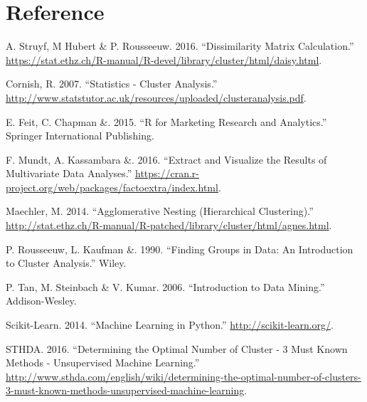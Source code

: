 \documentclass[]{article}
\begin{document}
\newpage

\section*{Reference}\label{reference}

\hypertarget{refs}{}
\hypertarget{ref-Str2016}{}
A. Struyf, M Hubert \& P. Rousseeuw. 2016. ``Dissimilarity Matrix
Calculation.''
\url{https://stat.ethz.ch/R-manual/R-devel/library/cluster/html/daisy.html}.

\hypertarget{ref-Cor2007}{}
Cornish, R. 2007. ``Statistics - Cluster Analysis.''
\url{http://www.statstutor.ac.uk/resources/uploaded/clusteranalysis.pdf}.

\hypertarget{ref-Cha2015}{}
E. Feit, C. Chapman \&. 2015. ``R for Marketing Research and
Analytics.'' Springer International Publishing.

\hypertarget{ref-Kas2016}{}
F. Mundt, A. Kassambara \&. 2016. ``Extract and Visualize the Results of
Multivariate Data Analyses.''
\url{https://cran.r-project.org/web/packages/factoextra/index.html}.

\hypertarget{ref-Mae2014}{}
Maechler, M. 2014. ``Agglomerative Nesting (Hierarchical Clustering).''
\url{http://stat.ethz.ch/R-manual/R-patched/library/cluster/html/agnes.html}.

\hypertarget{ref-Kau1990}{}
P. Rousseeuw, L. Kaufman \&. 1990. ``Finding Groups in Data: An
Introduction to Cluster Analysis.'' Wiley.

\hypertarget{ref-Tan2006}{}
P. Tan, M. Steinbach \& V. Kumar. 2006. ``Introduction to Data Mining.''
Addison-Wesley.

\hypertarget{ref-Sck2014}{}
Scikit-Learn. 2014. ``Machine Learning in Python.''
\url{http://scikit-learn.org/}.

\hypertarget{ref-STH2016}{}
STHDA. 2016. ``Determining the Optimal Number of Cluster - 3 Must Known
Methods - Unsupervised Machine Learning.''
\url{http://www.sthda.com/english/wiki/determining-the-optimal-number-of-clusters-3-must-known-methods-unsupervised-machine-learning}.
\end{document}
